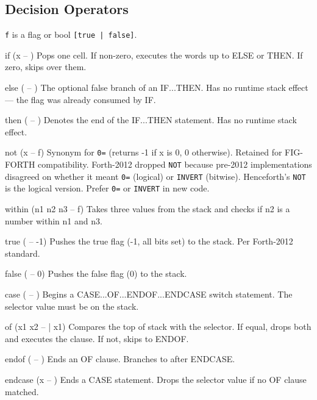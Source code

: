 \documentclass[a4paper, 11pt, openany]{book}
\begin{document}
\subsection{Decision Operators}

\begin{notebox}
\texttt{f} is a flag or bool \texttt{[true\,|\,false]}.
\end{notebox}

\begin{forthbox}
  if     (x -- )
         Pops one cell. If non-zero, executes the words up to ELSE
         or THEN. If zero, skips over them.

  else   ( -- )
         The optional false branch of an IF...THEN. Has no
         runtime stack effect --- the flag was already consumed by
         IF.

  then   ( -- )
         Denotes the end of the IF...THEN statement. Has no
         runtime stack effect.

  not    (x -- f)
         Synonym for \texttt{0=} (returns -1 if x is 0, 0 otherwise).
         Retained for FIG-FORTH compatibility. Forth-2012 dropped
         \texttt{NOT} because pre-2012 implementations disagreed on
         whether it meant \texttt{0=} (logical) or \texttt{INVERT}
         (bitwise). Henceforth's \texttt{NOT} is the logical version.
         Prefer \texttt{0=} or \texttt{INVERT} in new code.

  within (n1 n2 n3 -- f)
         Takes three values from the stack and checks if n2 is a
         number within n1 and n3.

  true   ( -- -1)
         Pushes the true flag (-1, all bits set) to the stack.
         Per Forth-2012 standard.

  false  ( -- 0)
         Pushes the false flag (0) to the stack.

  case   ( -- )
         Begins a CASE...OF...ENDOF...ENDCASE switch statement.
         The selector value must be on the stack.

  of     (x1 x2 -- | x1)
         Compares the top of stack with the selector. If equal,
         drops both and executes the clause. If not, skips to
         ENDOF.

  endof  ( -- )
         Ends an OF clause. Branches to after ENDCASE.

  endcase (x -- )
         Ends a CASE statement. Drops the selector value if no
         OF clause matched.


\end{forthbox}
\end{document}
